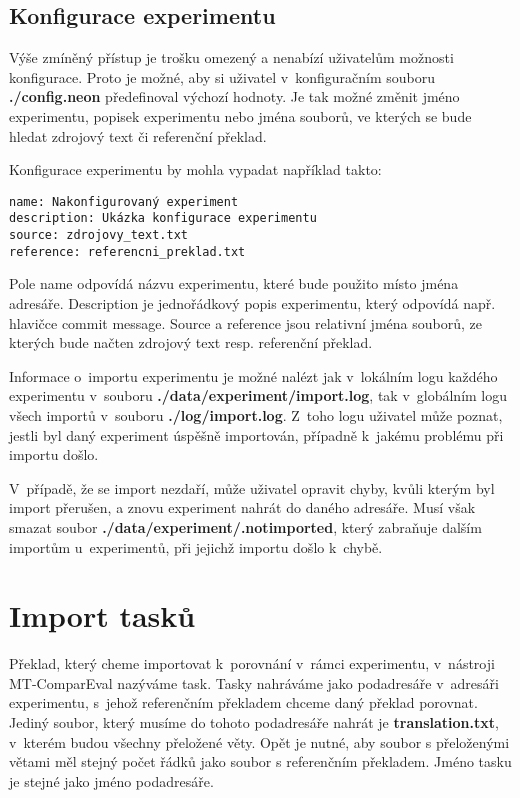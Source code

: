 \subsection{Konfigurace experimentu}
Výše zmíněný přístup je trošku omezený a nenabízí uživatelům možnosti konfigurace.
Proto je možné,
  aby si uživatel v~konfiguračním souboru \textbf{./config.neon} předefinoval výchozí hodnoty.
Je tak možné změnit jméno experimentu, popisek experimentu nebo jména souborů,
  ve kterých se bude hledat zdrojový text či referenční překlad.

Konfigurace experimentu by mohla vypadat například takto: \\

\begin{verbatim}
name: Nakonfigurovaný experiment
description: Ukázka konfigurace experimentu
source: zdrojovy_text.txt
reference: referencni_preklad.txt
\end{verbatim}

Pole name odpovídá názvu experimentu, které bude použito místo jména adresáře.
Description je jednořádkový popis experimentu,
  který odpovídá např. hlavičce commit message.
Source a reference jsou relativní jména souborů,
  ze kterých bude načten zdrojový text resp. referenční překlad.

Informace o~importu experimentu je možné nalézt
  jak v~lokálním logu každého experimentu v~souboru \textbf{./data/experiment/import.log},
  tak v~globálním logu všech importů v~souboru \textbf{./log/import.log}.
Z~toho logu uživatel může poznat,
  jestli byl daný experiment úspěšně importován,
  případně k~jakému problému při importu došlo.

V~případě, že se import nezdaří,
  může uživatel opravit chyby,
  kvůli kterým byl import přerušen,
  a znovu experiment nahrát do daného adresáře.
Musí však smazat soubor \textbf{./data/experiment/.notimported},
  který zabraňuje dalším importům u~experimentů,
  při jejichž importu došlo k~chybě.


\section{Import tasků}
Překlad,
  který cheme importovat k~porovnání v~rámci experimentu,
  v~nástroji \mbox{MT-ComparEval} nazýváme task.
Tasky nahráváme jako podadresáře v~adresáři experimentu,
  s~jehož referenčním překladem chceme daný překlad porovnat.
Jediný soubor, který musíme do tohoto podadresáře nahrát je \textbf{translation.txt},
  v~kterém budou všechny přeložené věty.
Opět je nutné, aby soubor s přeloženými větami měl stejný počet řádků jako soubor s referenčním překladem.
Jméno tasku je stejné jako jméno podadresáře.

